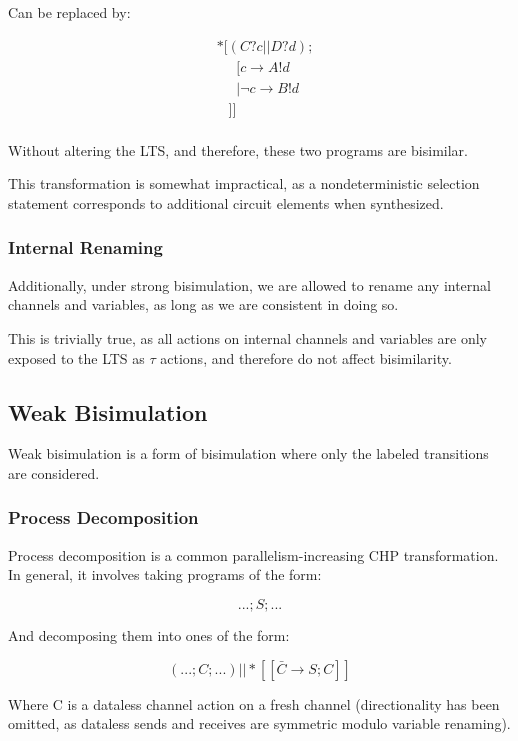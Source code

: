 \documentclass[times, 10pt]{article}
\begin{document}
Can be replaced by:

\begin{align*}
&*[(C?c || D?d); \\
& \;\;\;\;\;[ c \rightarrow A!d \\
& \;\;\;\;\;| \lnot c \rightarrow B!d \\
& \;\;\;]] \\
\end{align*}

Without altering the LTS, and therefore, these two programs are bisimilar.

This transformation is somewhat impractical, as a nondeterministic selection
statement corresponds to additional circuit elements when synthesized.

\subsubsection{Internal Renaming}

Additionally, under strong bisimulation, we are allowed to rename any internal
channels and variables, as long as we are consistent in doing so.

This is trivially true, as all actions on internal channels and variables are
only exposed to the LTS as $\tau$ actions, and therefore do not affect
bisimilarity. 

\subsection{Weak Bisimulation}

Weak bisimulation is a form of bisimulation where only the labeled transitions
are considered.

\subsubsection{Process Decomposition}

Process decomposition is a common parallelism-increasing CHP transformation.  In
general, it involves taking programs of the form:

\[
...;S;...
\]

And decomposing them into ones of the form:

\[
(...;C;...) || *[[\bar{C} \rightarrow S; C]]
\]

Where C is a dataless channel action on a fresh channel (directionality has been
omitted, as dataless sends and receives are symmetric modulo variable renaming).
\end{document}
